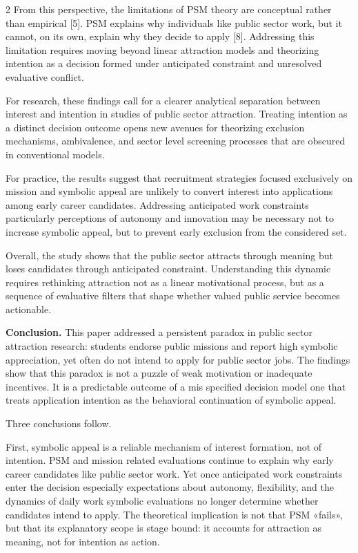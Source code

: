 \begin{multicols}{2}
From this perspective, the limitations of PSM theory are conceptual
rather than empirical {[}5{]}. PSM explains why individuals like public
sector work, but it cannot, on its own, explain why they decide to apply
{[}8{]}. Addressing this limitation requires moving beyond linear
attraction models and theorizing intention as a decision formed under
anticipated constraint and unresolved evaluative conflict.

For research, these findings call for a clearer analytical separation
between interest and intention in studies of public sector attraction.
Treating intention as a distinct decision outcome opens new avenues for
theorizing exclusion mechanisms, ambivalence, and sector level screening
processes that are obscured in conventional models.

For practice, the results suggest that recruitment strategies focused
exclusively on mission and symbolic appeal are unlikely to convert
interest into applications among early career candidates. Addressing
anticipated work constraints particularly perceptions of autonomy and
innovation may be necessary not to increase symbolic appeal, but to
prevent early exclusion from the considered set.

Overall, the study shows that the public sector attracts through meaning
but loses candidates through anticipated constraint. Understanding this
dynamic requires rethinking attraction not as a linear motivational
process, but as a sequence of evaluative filters that shape whether
valued public service becomes actionable.

{\bfseries Conclusion.} This paper addressed a persistent paradox in public
sector attraction research: students endorse public missions and report
high symbolic appreciation, yet often do not intend to apply for public
sector jobs. The findings show that this paradox is not a puzzle of weak
motivation or inadequate incentives. It is a predictable outcome of a
mis specified decision model one that treats application intention as
the behavioral continuation of symbolic appeal.

Three conclusions follow.

First, symbolic appeal is a reliable mechanism of interest formation,
not of intention. PSM and mission related evaluations continue to
explain why early career candidates like public sector work. Yet once
anticipated work constraints enter the decision especially expectations
about autonomy, flexibility, and the dynamics of daily work symbolic
evaluations no longer determine whether candidates intend to apply. The
theoretical implication is not that PSM «fails», but that its
explanatory scope is stage bound: it accounts for attraction as meaning,
not for intention as action.


\end{multicols}
